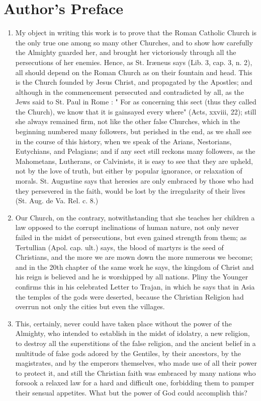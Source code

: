 \documentclass[12pt]{book}
\begin{document}
\chapter*{Author's Preface}
\begin{enumerate}
\item My object in writing this work is to prove that the Roman Catholic Church is the only true one among
so many other Churches, and to show how carefully the Almighty guarded her, and brought her
victoriously through all the persecutions of her enemies. Hence, as St. Iræneus says (Lib. 3, cap. 3, n. 2), all
should depend on the Roman Church as on their fountain and head. This is the Church founded by Jesus
Christ, and propagated by the Apostles; and although in the commencement persecuted and contradicted
by all, as the Jews said to St. Paul in Rome : " For as concerning this sect (thus they called the Church), we
know that it is gainsayed every where" (Acts, xxviii, 22); still she always remained firm, not like the other
false Churches, which in the beginning numbered many followers, but perished in the end, as we shall
see in the course of this history, when we speak of the Arians, Nestorians, Eutychians, and Pelagians; and
if any sect still reckons many followers, as the Mahometans, Lutherans, or Calvinists, it is easy to see that
they are upheld, not by the love of truth, but either by popular ignorance, or relaxation of morals. St.
Augustine says that heresies are only embraced by those who had they persevered in the faith, would be
lost by the irregularity of their lives (St. Aug. de Va. Rel. c. 8.)

\item Our Church, on the contrary, notwithstanding that she teaches her children a law opposed to the
corrupt inclinations of human nature, not only never failed in the midst of persecutions, but even gained
strength from them; as Tertullian (Apol. cap. ult.) says, the blood of martyrs is the seed of Christians, and
the more we are mown down the more numerous we become; and in the 20th chapter of the same work
he says, the kingdom of Christ and his reign is believed and he is worshipped by all nations. Pliny the
Younger confirms this in his celebrated Letter to Trajan, in which he says that in Asia the temples of the
gods were deserted, because the Christian Religion had overrun not only the cities but even the villages.

\item This, certainly, never could have taken place without the power of the Almighty, who intended to
establish in the midst of idolatry, a new religion, to destroy all the superstitions of the false religion, and
the ancient belief in a multitude of false gods adored by the Gentiles, by their ancestors, by the
magistrates, and by the emperors themselves, who made use of all their power to protect it, and still the
Christian faith was embraced by many nations who forsook a relaxed law for a hard and difficult one,
forbidding them to pamper their sensual appetites. What but the power of God could accomplish this?


\end{enumerate}
\end{document}
